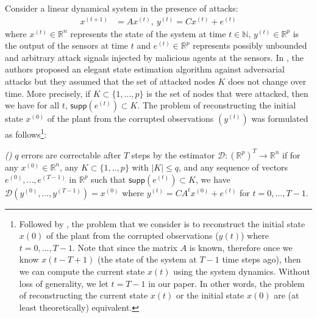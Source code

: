 \documentclass[../../thesis.tex]{subfiles}
\begin{document}
Consider a linear dynamical system in the presence of attacks:
\begin{eqnarray}
		x^{(t+1)} &= A x^{(t)}, ~y^{(t)} = C x ^{(t)} + e^{(t)}
		\label{eq:system_model}
\end{eqnarray}
where $x^{(t)}\in \mathbb{R}^n$ represents the state of the system at time $t\in \mathbb{N}$, $y^{(t)} \in \mathbb{R}^p$ is the output of the sensors at time $t$ and $e^{(t)} \in \mathbb{R}^p $ represents possibly unbounded and arbitrary attack signals injected by malicious agents at the sensors. In \cite{Fawzi2014}, the authors proposed an elegant state estimation algorithm against adversarial attacks but they assumed that the set of attacked nodes $K$ does not change over time. More precisely, if $K \subset \{1, ..., p\}$ is the set of nodes that were attacked, then we have for all $t$, $\textsf{supp}(e^{(t)})\subset K$. The problem of reconstructing the initial state $x^{(0)}$ of the plant from the corrupted observations $( y^{(t)})$ was formulated as follows\footnote{Followed by \cite{Fawzi2014}, the problem that we consider is to reconstruct the initial state $x(0)$ of the plant from the corrupted observations ($y(t)$) where $t=0,...,T-1$. Note that since the matrix $A$ is known, therefore once we know $x(t-T+1)$ (the state of the system at $T-1$ time steps ago), then we can compute the current state $x(t)$ using the system dynamics. Without loss of generality, we let $t=T-1$ in our paper. In other words, the problem of reconstructing the current state $x(t)$ or the initial state $x(0)$ are (at least theoretically) equivalent.}:

\begin{definition} \emph{(\hspace{1sp}\cite{Fawzi2014})} 
$q$ errors are correctable after $T$ steps by the estimator $\mathcal{D}: {(\mathbb{R} ^p) } ^T  \rightarrow \mathbb{R}^n$ if for any $x^{(0)} \in \mathbb{R}^n$, any $K \subset \{1,.., p\} $ with $\lvert K \rvert \le q$, and any sequence of vectors $e^{(0)},...,e^{(T-1)}$ in $\mathbb{R}^p$ such that $\textsf{supp}(e^{(t)}) \subset K$, we have $\mathcal{D} (y^{(0)},...,y^{(T-1)}) = x^{(0)}$ where $y^{(t)} = CA^t x^{(0)} + e^{(t)}$ for $t=0,...,T-1$.
\end{definition}
\end{document}

